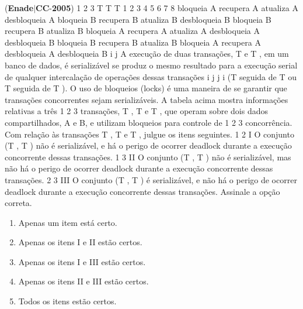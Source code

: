 \documentclass{exam}
\begin{document}
\begin{questions}
\begin{enumerate}[label=\alph*)]
	\end{enumerate}

\question (\textbf{Enade}$|$\textbf{CC}-\textbf{2005}) 1 2 3
T T T
1
2
3
4
5
6
7
8
bloqueia A
recupera A
atualiza A
desbloqueia A
bloqueia B
recupera B
atualiza B
desbloqueia B
bloqueia B
recupera B
atualiza B
bloqueia A
recupera A
atualiza A
desbloqueia A
desbloqueia B
bloqueia B
recupera B
atualiza B
bloqueia A
recupera A
desbloqueia A
desbloqueia B
i j
A execução de duas transações, T e T , em um banco de dados,
é serializável se produz o mesmo resultado para a execução serial
de qualquer intercalação de operações dessas transações
i j j i
(T seguida de T ou T seguida de T ). O uso de bloqueios (locks)
é uma maneira de se garantir que transações concorrentes sejam
serializáveis. A tabela acima mostra informações relativas a três
1 2 3
transações, T , T e T , que operam sobre dois dados
compartilhados, A e B, e utilizam bloqueios para controle de
1 2 3
concorrência. Com relação às transações T , T e T , julgue os
itens seguintes.
1 2
I O conjunto (T , T ) não é serializável, e há o perigo de
ocorrer deadlock durante a execução concorrente dessas
transações.
1 3
II O conjunto (T , T ) não é serializável, mas não há o perigo de
ocorrer deadlock durante a execução concorrente dessas
transações.
2 3
III O conjunto (T , T ) é serializável, e não há o perigo de
ocorrer deadlock durante a execução concorrente dessas
transações.
Assinale a opção correta.
	\begin{enumerate}[label=\alph*)]
		\item  Apenas um item está certo.
		\item  Apenas os itens I e II estão certos.
		\item  Apenas os itens I e III estão certos.
		\item  Apenas os itens II e III estão certos.
		\item  Todos os itens estão certos.

	\end{enumerate}


\end{questions}
\end{document}
